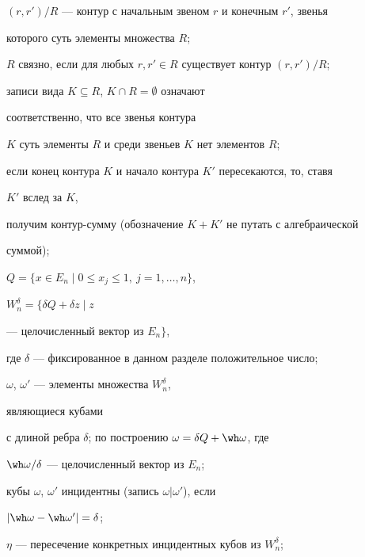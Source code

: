  


$(r,r')/R$ --- контур с начальным звеном $r$ и конечным $r'$, звенья 


которого суть элементы множества $R$; 


 


$R$ связно, если для любых $r,r'\in R$ существует контур $(r,r')/R$; 


 


записи вида $K\subseteq R$, $K\cap R=\emptyset$ означают 


соответственно, что все звенья контура 


$K$ суть элементы $R$ и среди звеньев $K$ нет элементов $R$; 


 


если конец контура $K$ и начало контура $K'$ пересекаются, то, ставя 


$K'$ вслед за $K$, 


получим контур-сумму (обозначение $K+K'$ не путать с алгебраической 


суммой);


 


$Q=\{x\in E_n\mid0\le x_j\le1,\ j=1,\dotsc,n\}$, 


$W^\delta_n=\{\delta Q+\delta z\mid z$ 


--- целочисленный вектор из $E_n\}$, 


где $\delta$ --- фиксированное в данном разделе положительное число;


 


$\omega$, $\omega'$ --- элементы множества $W^\delta_n$, 


являющиеся кубами 


с длиной ребра $\delta$; по построению $\omega=\delta Q+\wh\omega$, где 


$\wh\omega/\delta$ --- целочисленный вектор из $E_n$; 


 


кубы $\omega$, $\omega'$ инцидентны (запись $\omega|\omega'$), если 


$|\wh\omega-\wh\omega'|=\delta$; 


 


$\eta$ --- пересечение конкретных инцидентных кубов из $W^\delta_n$; 


